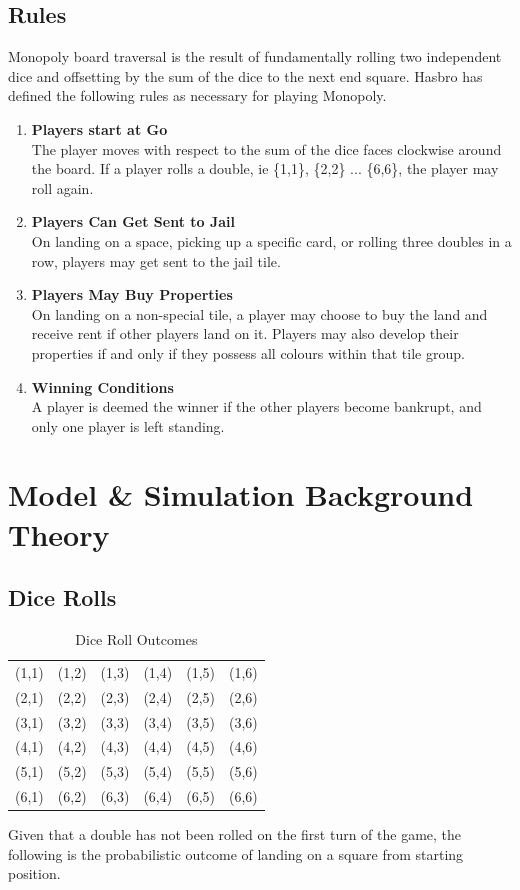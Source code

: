 \documentclass[12pt]{article}
\begin{document}
\subsection{Rules}
Monopoly board traversal is the result of fundamentally rolling two independent dice and offsetting by the sum of the dice to the next end square. Hasbro has defined the following rules as necessary for playing Monopoly.\cite{hasbro}
\begin{enumerate}
  \item \textbf{Players start at Go} \hfill \\
  The player moves with respect to the sum of the dice faces clockwise around the board. If a player rolls a double, ie \{1,1\}, \{2,2\} ... \{6,6\}, the player may roll again.
  \item \textbf{Players Can Get Sent to Jail} \hfill \\
  On landing on a space, picking up a specific card, or rolling three doubles in a row, players may get sent to the jail tile.
  \item \textbf{Players May Buy Properties} \hfill \\
  On landing on a non-special tile, a player may choose to buy the land and receive rent if other players land on it. Players may also develop their properties if and only if they possess all colours within that tile group.
  \item \textbf{Winning Conditions} \hfill \\
  A player is deemed the winner if the other players become bankrupt, and only one player is left standing.
\end{enumerate}
\section{Model \& Simulation Background Theory}
\subsection{Dice Rolls}
\begin{table}[h]
\centering
\label{Dice Roll Outcomes}
\begin{tabular}{cccccc}
(1,1) & (1,2) & (1,3) & (1,4) & (1,5) & (1,6) \\
(2,1) & (2,2) & (2,3) & (2,4) & (2,5) & (2,6) \\
(3,1) & (3,2) & (3,3) & (3,4) & (3,5) & (3,6) \\
(4,1) & (4,2) & (4,3) & (4,4) & (4,5) & (4,6) \\
(5,1) & (5,2) & (5,3) & (5,4) & (5,5) & (5,6) \\
(6,1) & (6,2) & (6,3) & (6,4) & (6,5) & (6,6)
\end{tabular}
\caption{Dice Roll Outcomes}
\end{table}
Given that a double has not been rolled on the first turn of the game, the following is the probabilistic outcome of landing on a square from starting position.\cite{fellerw}
\end{document}

